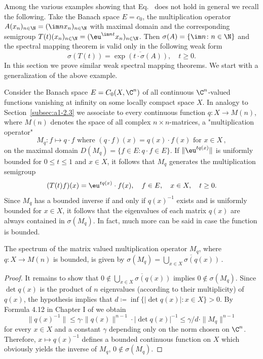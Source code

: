 Among the various examples showing that Eq.~ does not hold in general we recall the following.
Take the Banach space $E = c_{0}$, the multiplication operator $A(x_{n})_{n\in\N} = (\im n x_{n})_{n\in\N}$ with maximal domain and the corresponding semigroup $T(t)(x_{n})_{n \in \N} = 
(\eu^{\im nt}x_{n})_{n \in \N}$.
Then $\sigma(A) = \{\im n \colon n \in \N\}$ and the spectral mapping theorem is valid only in the following weak form
\begin{equation}\label{eq:a3-7.2}
	\sigma(T(t)) = \overline{\exp(t\cdot\sigma(A))}, \quad t \geq 0 .
\end{equation}
In this section we prove similar weak spectral mapping theorems.
We start with a generalization of the above example.

Consider the Banach space $E = C_{0}(X,\C^{n})$ of all continuous $\C^{n}$-valued functions vanishing at infinity on some locally compact space $X$.
In analogy to Section~\ref{subsec:a1-2.3} we associate to every continuous function $q \colon X \to M(n)$, where $M(n)$ denotes the space of all complex $n\times n$-matrices, a "multiplication operator" 
\[
M_{q} \colon f \mapsto q\cdot f \text{ where } (q\cdot f)(x) = q(x)\cdot f(x) \text{ for } x \in X\,,
\]
on the maximal domain $D(M_{q}) = \{f \in E \colon q\cdot f \in E\}$.
If\/ $\|\eu^{tq(x)}\|$ is uniformly bounded for $0 \leq t \leq 1$ and $x \in X$, it follows that $M_{q}$ generates the multiplication semigroup
\[
	(T(t)f)(x) = \eu^{tq(x)}\cdot f(x), \quad f \in E, \quad x \in X, \quad t \geq 0 .
\]
Since $M_{q}$ has a bounded inverse if and only if\/ $q(x)^{-1}$ exists and is uniformly bounded for $x \in X$, it follows that the eigenvalues of each matrix $q(x)$ are always contained in $\sigma(M_{q})$.
In fact, much more can be said in case the function is bounded.
\begin{lemma}\label{lem:a3-7.1}
The spectrum of the matrix valued multiplication operator $M_{q}$, where $q \colon X \to M(n)$ is bounded, is given by $\sigma(M_{q}) = \overline{\bigcup_{x\in X} \sigma(q(x))}$\,.
\end{lemma}
\begin{proof}
It remains to show that $0 \notin \overline{\bigcup_{x\in X} \sigma(q(x))}$ implies $0 \notin \sigma(M_{q})$.
Since $\det q(x)$ is the product of\/ $n$ eigenvalues (according to their multiplicity) of\/ $q(x)$, the hypothesis implies that $d \coloneqq \inf\{|\det q(x)| \colon x \in X\} > 0$.
By Formula 4.12 in Chapter I of \textcite{kato:1976} we obtain
\[
\|q(x)^{-1}\| \leq \gamma \cdot \|q(x)\|^{n-1} \cdot |\det q(x)|^{-1} \leq \gamma/d \cdot \|M_{q}\|^{n-1}
\]
for every $x \in X$ and a constant $\gamma$ depending only on the norm chosen on $\C^{n}$.
Therefore, $x \mapsto q(x)^{-1}$ defines a bounded continuous function on $X$ which obviously yields the inverse of\/ $M_{q}$, \ie $0 \notin \sigma(M_{q})$.
\end{proof}
